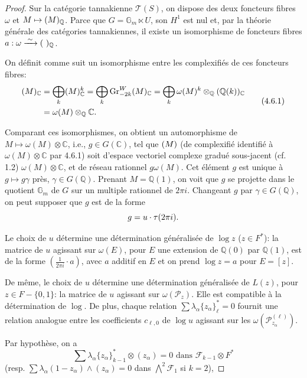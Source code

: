 \documentclass[12pt,a4paper]{article}
\theoremstyle{plain}
\theoremstyle{definition}
\theoremstyle{remark}
\newcommand{\Q}{\mathbb{Q}}
\newcommand{\C}{\mathbb{C}}
\newcommand{\Gm}{\mathbb{G}_m}
\newcommand{\F}{\mathcal{F}}
\begin{document}
\begin{proof}
Sur la cat\'egorie tannakienne $\mathcal{T}(S)$, on dispose des deux foncteurs fibres $\omega$ et $M\mapsto\real(M)_\Q$. Parce que $G=\Gm\ltimes U$, son $H^1$ est nul et, par la th\'eorie g\'en\'erale des cat\'egories tannakiennes, il existe un isomorphisme de foncteurs fibres $a:\omega\xrightarrow{\;\sim\;}\real(\ )_\Q$.

On d\'efinit comme suit un isomorphisme entre les complexifi\'es de ces foncteurs fibres:
\begin{equation}\label{eq:4.6.1}
\begin{aligned}
\real(M)_\C &= \bigoplus_k\real(M)_\C^k = \bigoplus_k\operatorname{Gr}^W_{-2k}\real(M)_\C = \bigoplus_k\omega(M)^k\otimes_\Q\real(\Q(k))_\C\\
&= \omega(M)\otimes_\Q\C.
\end{aligned}
\tag{4.6.1}
\end{equation}

Comparant ces isomorphismes, on obtient un automorphisme de $M\mapsto\omega(M)\otimes\C$, i.e., $g\in G(\C)$, tel que $\real(M)$ (de complexifi\'e identifi\'e {\`a} $\omega(M)\otimes\C$ par 4.6.1) soit d'espace vectoriel complexe gradu\'e sous-jacent (cf. 1.2) $\omega(M)\otimes\C$, et de r\'eseau rationnel $g\omega(M)$. Cet \'el\'ement $g$ est unique {\`a} $g\mapsto g\gamma$ pr\`es, $\gamma\in G(\Q)$. Prenant $M=\Q(1)$, on voit que $g$ se projette dans le quotient $\Gm$ de $G$ sur un multiple rationnel de $2\pi i$. Changeant $g$ par $\gamma\in G(\Q)$, on peut supposer que $g$ est de la forme
\begin{equation*}
g = u\cdot\tau(2\pi i).\qedhere
\end{equation*}

Le choix de $u$ d\'etermine une d\'etermination g\'en\'eralis\'ee de $\log z$ ($z\in F^*$): la matrice de $u$ agissant sur $\omega(E)$, pour $E$ une extension de $\Q(0)$ par $\Q(1)$, est de la forme $(\frac{1}{2\pi i}\cdot a)$, avec $a$ additif en $E$ et on prend $\log z=a$ pour $E=[z]$.

De m\^eme, le choix de $u$ d\'etermine une d\'etermination g\'en\'eralis\'ee de $L(z)$, pour $z\in F-\{0,1\}$: la matrice de $u$ agissant sur $\omega(\mathcal{P}_z)$. Elle est compatible {\`a} la d\'etermination de $\log$. De plus, chaque relation $\sum\lambda_\alpha\{z_\alpha\}_\ell^*=0$ fournit une relation analogue entre les coefficients $c_{\ell,0}$ de $\log u$ agissant sur les $\omega(\mathcal{P}_{z_\alpha}^{(\ell)})$.

Par hypoth\`ese, on a
\begin{equation*}
\sum\lambda_\alpha\{z_\alpha\}_{k-1}^*\otimes(z_\alpha)=0\text{ dans }\F_{k-1}\otimes F^*
\end{equation*}
(resp. $\sum\lambda_\alpha(1-z_\alpha)\wedge(z_\alpha)=0$ dans $\bigwedge^2\F_1$ si $k=2$),


\end{proof}
\end{document}
